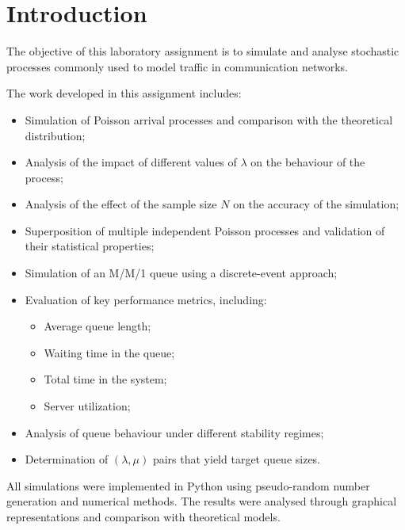\documentclass[12pt]{article}
\begin{document}
\thispagestyle{empty}

\setcounter{page}{0}

\tableofcontents
\newpage

\newpage

\section{Introduction}

The objective of this laboratory assignment is to simulate and analyse stochastic processes commonly used to model traffic in communication networks.

The work developed in this assignment includes:

\begin{itemize}
    \item Simulation of Poisson arrival processes and comparison with the theoretical distribution;
    \item Analysis of the impact of different values of $\lambda$ on the behaviour of the process;
    \item Analysis of the effect of the sample size $N$ on the accuracy of the simulation;
    \item Superposition of multiple independent Poisson processes and validation of their statistical properties;
    \item Simulation of an M/M/1 queue using a discrete-event approach;
    \item Evaluation of key performance metrics, including:
    \begin{itemize}
        \item Average queue length;
        \item Waiting time in the queue;
        \item Total time in the system;
        \item Server utilization;
    \end{itemize}
    \item Analysis of queue behaviour under different stability regimes;
    \item Determination of $(\lambda, \mu)$ pairs that yield target queue sizes.
\end{itemize}

All simulations were implemented in Python using pseudo-random number generation and numerical methods. The results were analysed through graphical representations and comparison with theoretical models.

\newpage
\end{document}

